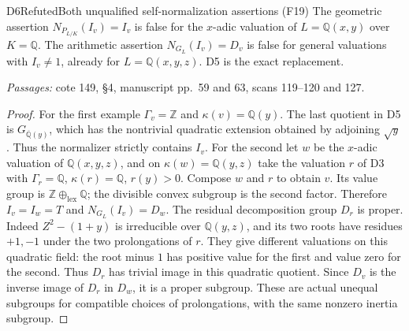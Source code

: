 \begin{result}{D6}{Refuted}{Both unqualified self-normalization assertions (F19)}
The geometric assertion $N_{P_{L/K}}(I_v)=I_v$ is false for the $x$-adic valuation of $L=\mathbb Q(x,y)$ over $K=\mathbb Q$. The arithmetic assertion $N_{G_L}(I_v)=D_v$ is false for general valuations with $I_v\ne1$, already for $L=\mathbb Q(x,y,z)$. D5 is the exact replacement.
\par\emph{Passages:} cote 149, \S4, manuscript pp.~59 and 63, scans 119--120 and 127.
\end{result}
\begin{proof}
For the first example $\Gamma_v=\mathbb Z$ and $\kappa(v)=\mathbb Q(y)$. The last quotient in D5 is $G_{\overline{\mathbb Q}(y)}$, which has the nontrivial quadratic extension obtained by adjoining $\sqrt y$. Thus the normalizer strictly contains $I_v$.
For the second let $w$ be the $x$-adic valuation of $\mathbb Q(x,y,z)$, and on $\kappa(w)=\mathbb Q(y,z)$ take the valuation $r$ of D3 with $\Gamma_r=\mathbb Q$, $\kappa(r)=\mathbb Q$, $r(y)>0$. Compose $w$ and $r$ to obtain $v$. Its value group is $\mathbb Z\oplus_{\mathrm{lex}}\mathbb Q$; the divisible convex subgroup is the second factor. Therefore $I_v=I_w=T$ and $N_{G_L}(I_v)=D_w$.
The residual decomposition group $D_r$ is proper. Indeed $Z^2-(1+y)$ is irreducible over $\mathbb Q(y,z)$, and its two roots have residues $+1,-1$ under the two prolongations of $r$. They give different valuations on this quadratic field: the root minus $1$ has positive value for the first and value zero for the second. Thus $D_r$ has trivial image in this quadratic quotient. Since $D_v$ is the inverse image of $D_r$ in $D_w$, it is a proper subgroup. These are actual unequal subgroups for compatible choices of prolongations, with the same nonzero inertia subgroup.
\end{proof}

